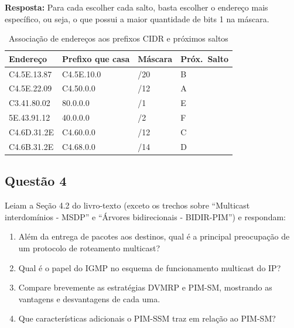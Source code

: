 \textbf{Resposta:}
Para cada escolher cada salto, basta escolher o endereço mais específico, ou seja, o que
possui a maior quantidade de bits 1 na máscara.\\

\begin{table}[ht]
\centering
\caption{Associação de endereços aos prefixos CIDR e próximos saltos}
\label{tab:roteamento}
\begin{tabular}{llll}
\toprule
\textbf{Endereço}      & \textbf{Prefixo que casa} & \textbf{Máscara} & \textbf{Próx.\ Salto} \\
\midrule
C4.5E.13.87 & C4.5E.10.0  & /20 & B \\
C4.5E.22.09 & C4.50.0.0   & /12 & A \\
C3.41.80.02 & 80.0.0.0    & /1  & E \\
5E.43.91.12 & 40.0.0.0    & /2  & F \\
C4.6D.31.2E & C4.60.0.0   & /12 & C \\
C4.6B.31.2E & C4.68.0.0   & /14 & D \\
\bottomrule
\end{tabular}
\end{table}

\subsection{Questão 4}
Leiam a Seção 4.2 do livro-texto (exceto os trechos sobre “Multicast
interdomínios - MSDP” e “Árvores bidirecionais - BIDIR-PIM”) e respondam:

\begin{enumerate}[label=\alph*.]
    \item Além da entrega de pacotes aos destinos, qual é a principal preocupação de um
    protocolo de roteamento multicast?
    \item Qual é o papel do IGMP no esquema de funcionamento multicast do IP?
    \item Compare brevemente as estratégias DVMRP e PIM-SM, mostrando as vantagens e
    desvantagens de cada uma.
    \item Que características adicionais o PIM-SSM traz em relação ao PIM-SM?
\end{enumerate}

